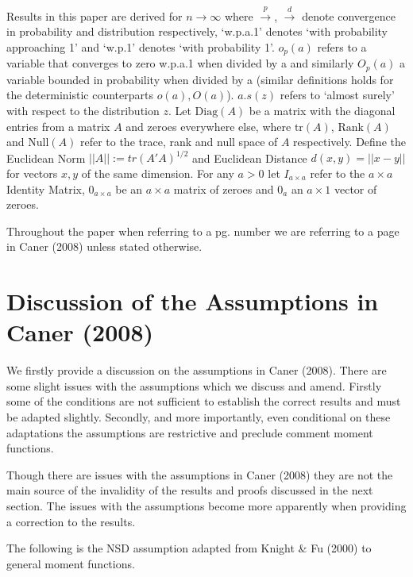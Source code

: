 \documentclass[11pt, fleqn]{article}
\begin{document}
Results in this paper are derived for $n\rightarrow \infty$ where $\overset{p}{\rightarrow}$, $\overset{d}{\rightarrow}$ denote convergence in probability and distribution respectively, `w.p.a.1' denotes `with probability approaching 1' and `w.p.1' denotes `with probability 1'.  $o_p(a)$  refers to a variable that converges to zero w.p.a.1 when divided by a and similarly $O_p(a)$ a variable bounded in probability when divided by a (similar definitions holds for the deterministic counterparts $o(a),O(a)$). $a.s(z)$ refers to `almost surely' with respect to the distribution $z$.  Let $\textrm{Diag}(A)$ be a matrix with the diagonal entries from a matrix $A$ and zeroes everywhere else, where $\textrm{tr}(A)$, $\textrm{Rank}(A)$ and $\textrm{Null}(A)$  refer to the trace, rank and null space of $A$ respectively. Define the Euclidean Norm $|\!|A|\!|:=tr(A'A)^{1/2} $ and Euclidean Distance $d(x,y)=|\!|x-y|\!|$ for vectors $x,y$ of the same dimension. For any $a>0$ let $I_{a\times a}$ refer to the $a \times a$ Identity Matrix,  $0_{a \times a} $ be an $a \times a$ matrix of zeroes and $0_{a}$ an $ a \times 1$ vector of zeroes.

Throughout the paper when referring to a pg. number we are referring to a page in Caner (2008) unless stated otherwise. 


\section{Discussion of the Assumptions in Caner (2008)}
We firstly provide a discussion on the assumptions in Caner (2008). There are some slight issues with the assumptions which we discuss and amend.  Firstly some of the conditions are not sufficient to establish the correct results and must be adapted slightly.  Secondly, and more importantly, even conditional on these adaptations the assumptions are restrictive and preclude comment moment functions.

Though there are issues with the assumptions in Caner (2008) they are not the main source of the invalidity of the results  and proofs  discussed in the next section. The issues with the assumptions become more apparently when providing a correction to the results. 

The following is the NSD assumption adapted from Knight \& Fu (2000) to general moment functions. \\
\end{document}
